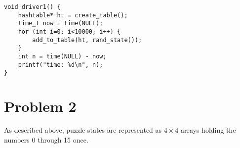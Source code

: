 \documentclass[11pt]{article}
\begin{document}
\begin{verbatim}
void driver1() {
    hashtable* ht = create_table();
    time_t now = time(NULL);
    for (int i=0; i<10000; i++) {
        add_to_table(ht, rand_state());
    }
    int n = time(NULL) - now;
    printf("time: %d\n", n);
}
\end{verbatim}



\section{Problem 2}
\label{sec-2}

As described above, puzzle states are represented as $4\times 4$
arrays holding the numbers 0 through 15 once. 
\end{document}
